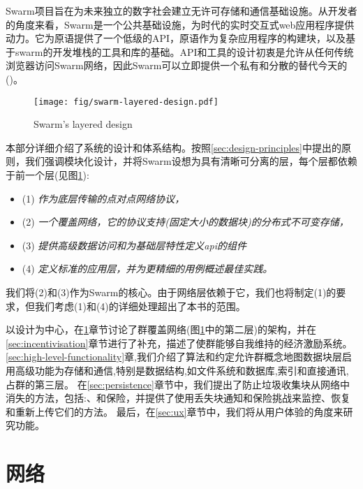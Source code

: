 
\green{}

Swarm项目旨在为未来独立的数字社会建立无许可存储和通信基础设施。从开发者的角度来看，Swarm是一个公共基础设施，为时代的实时交互式web应用程序提供动力。它为原语提供了一个低级的API，原语作为复杂应用程序的构建块，以及基于swarm的开发堆栈的工具和库的基础。API和工具的设计初衷是允许从任何传统浏览器访问Swarm网络，因此Swarm可以立即提供一个私有和分散的替代今天的 ()。

\begin{figure}[htbp]
  \centering
    \texttt{[image: fig/swarm-layered-design.pdf]}
  \caption[Swarm's layered design \statusgreen]{Swarm's layered design}
\label{fig:Swarm-layered-design}
\end{figure}

本部分详细介绍了系统的设计和体系结构。按照\ref{sec:design-principles}中提出的原则，我们强调模块化设计，并将Swarm设想为具有清晰可分离的层，每个层都依赖于前一个层(见图\ref{fig:Swarm-layered-design}):

\begin{itemize}
\item (1) \emph{作为底层传输的点对点网络协议，}
\item (2) \emph{一个覆盖网络，它的协议支持(固定大小的数据块)的分布式不可变存储，}
\item (3) \emph{提供高级数据访问和为基础层特性定义api的组件}
\item (4) \emph{定义标准的应用层，并为更精细的用例概述最佳实践。}
\end{itemize}

我们将(2)和(3)作为Swarm的核心。由于网络层依赖于它，我们也将制定(1)的要求，但我们考虑(1)和(4)的详细处理超出了本书的范围。


以设计为中心，在\ref{sec:network}章节讨论了群覆盖网络(图\ref{fig:Swarm-layered-design}中的第二层)的架构，并在\ref{sec:incentivisation}章节进行了补充，描述了使群能够自我维持的经济激励系统。\ref{sec:high-level-functionality}章,我们介绍了算法和约定允许群概念地图数据块层启用高级功能为存储和通信,特别是数据结构,如文件系统和数据库,索引和直接通讯,占群的第三层。
在\ref{sec:persistence}章节中，我们提出了防止垃圾收集块从网络中消失的方法，包括:、和保险，并提供了使用丢失块通知和保险挑战来监控、恢复和重新上传它们的方法。 
最后，在\ref{sec:ux}章节中，我们将从用户体验的角度来研究功能。

\chapter{网络}\label{sec:network}

